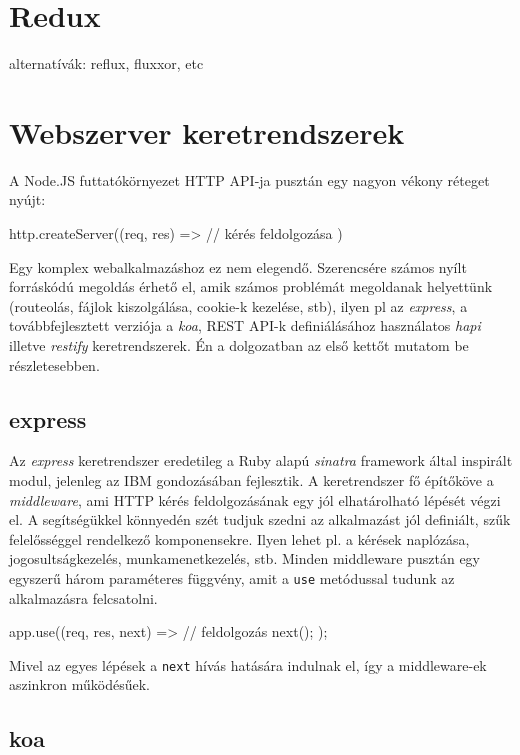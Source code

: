 \section{Redux}

alternatívák: reflux, fluxxor, etc

\section{Webszerver keretrendszerek}

A Node.JS futtatókörnyezet HTTP API-ja pusztán egy nagyon vékony réteget nyújt:

\begin{js}
http.createServer((req, res) => {
  // kérés feldolgozása
})
\end{js}

Egy komplex webalkalmazáshoz ez nem elegendő.  Szerencsére számos nyílt
forráskódú megoldás érhető el, amik számos problémát megoldanak helyettünk
(routeolás, fájlok kiszolgálása, cookie-k kezelése, stb), ilyen pl az
\emph{express}, a továbbfejlesztett verziója a \emph{koa}, REST API-k
definiálásához használatos \emph{hapi} illetve \emph{restify} keretrendszerek.
Én a dolgozatban az első kettőt mutatom be részletesebben.

\subsection{express}

Az \emph{express} keretrendszer eredetileg a Ruby alapú \emph{sinatra} framework
által inspirált modul, jelenleg az IBM gondozásában fejlesztik.  A keretrendszer
fő építőköve a \emph{middleware}, ami HTTP kérés feldolgozásának egy jól
elhatárolható lépését végzi el.  A segítségükkel könnyedén szét tudjuk szedni az
alkalmazást jól definiált, szűk felelősséggel rendelkező komponensekre. Ilyen
lehet pl. a kérések naplózása, jogosultságkezelés, munkamenetkezelés, stb.
Minden middleware pusztán egy egyszerű három paraméteres függvény, amit a
\texttt{use} metódussal tudunk az alkalmazásra felcsatolni.

\begin{js}
app.use((req, res, next) => {
  // feldolgozás
  next();
});
\end{js}

Mivel az egyes lépések a \texttt{next} hívás hatására indulnak el, így a
middleware-ek aszinkron működésűek.

\subsection{koa}

